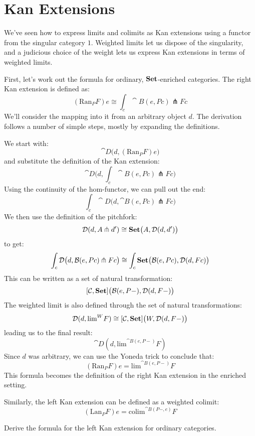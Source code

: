 \documentclass[DaoFP]{subfiles}
\begin{document}
\section{Kan Extensions}

We've seen how to express limits and colimits as Kan extensions using a functor from the singular category $1$. Weighted limits let us dispose of the singularity, and a judicious choice of the weight lets us express Kan extensions in terms of weighted limits. 

First, let's work out the formula for ordinary, $\mathbf{Set}$-enriched categories. The right Kan extension is defined as:
 \[ (\text{Ran}_P F) e \cong \int_c \cat B (e, P c) \pitchfork F c \]
 We'll consider the mapping into it from an arbitrary object $d$. The derivation follows a number of simple steps, mostly by expanding the definitions. 
 
 We start with:
\[ \cat D\big(d, (\text{Ran}_P F) e\big) \]
 and substitute the definition of the Kan extension:
 \[ \cat D\big(d, \int_c \cat B (e, P c) \pitchfork F c\big) \]
Using the continuity of the hom-functor, we can pull out the end:
 \[ \int_c \cat D\big(d,  \cat B (e, P c) \pitchfork F c\big) \]
We then use the definition of the pitchfork:
\[ \mathcal{D} (d, A \pitchfork d') \cong \mathbf{Set}  \big(A, \mathcal{D}(d, d')\big) \]
to get:
 \[ \int_c \mathcal{D}\big(d,  \mathcal{B} (e, P c) \pitchfork F c\big) \cong \int_c \mathbf{Set}\big( \mathcal{B}(e, P c), \mathcal{D}(d, F c)\big)\]
This can be written as a set of natural transformation:
\[ [\mathcal{C}, \mathbf{Set}] \big(\mathcal{B}(e, P-), \mathcal{D}(d, F-)\big) \]
The weighted limit is also defined through the set of natural transformations:
\[  \mathcal D(d, \text{lim}^W F) \cong [\mathcal C, \mathbf{Set}] \big(W, \mathcal D(d, F-)\big) \]
leading us to the final result:
\[ \cat D(d, \text{lim}^{\cat B (e, P-)} F) \]
Since $d$ was arbitrary, we can use the Yoneda trick to conclude that:
\[ (\text{Ran}_P F) e = \text{lim}^{\cat B(e, P-)} F  \]
This formula becomes the definition of the right Kan extension in the enriched setting.

Similarly, the left Kan extension can be defined as a weighted colimit:
\[ (\text{Lan}_P F) e = \text{colim}^{\cat B(P-, e)} F \]

\begin{exercise}
Derive the formula for the left Kan extension for ordinary categories.
\end{exercise}
\end{document}
